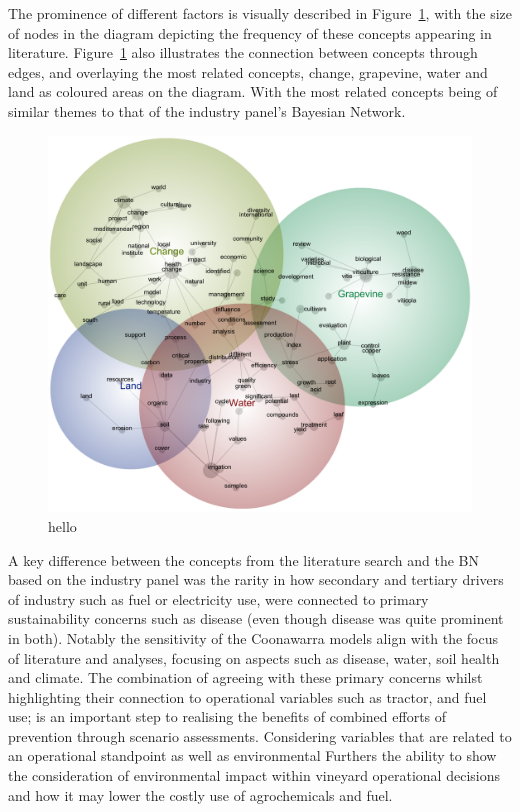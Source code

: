 \documentclass[fleqn,10pt]{wlscirep}
\begin{document}
The prominence of different factors is visually described in Figure~\ref{fig:lexi}, with the size of nodes in the diagram depicting the frequency of these concepts appearing in literature. Figure~\ref{fig:lexi} also illustrates the connection between concepts through edges, and overlaying the most related concepts, change, grapevine, water and land as coloured areas on the diagram. With the most related concepts being of similar themes to that of the industry panel's Bayesian Network.

\begin{figure}[h]
    \centering
    \includegraphics[width=\linewidth]{Winegrowing-concept-map}
    \caption{hello}\label{fig:lexi}
\end{figure}

A key difference between the concepts from the literature search and the BN based on the industry panel was the rarity in how secondary and tertiary drivers of industry such as fuel or electricity use, were connected to primary sustainability concerns such as disease (even though disease was quite prominent in both). Notably the sensitivity of the Coonawarra models align with the focus of literature and analyses, focusing on  aspects such as disease, water, soil health and climate. The combination of agreeing with these primary concerns whilst highlighting their connection to operational variables such as tractor, and fuel use; is an important step to realising the benefits of combined efforts of prevention through scenario assessments. Considering variables that are related to an operational standpoint as well as environmental Furthers the ability to show the consideration of environmental impact within vineyard operational decisions and how it may lower the costly use of agrochemicals and fuel.
\end{document}
